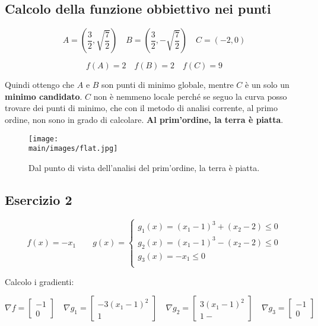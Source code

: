 \documentclass[\main/main.tex]{subfiles}
\begin{document}
\subsection{Calcolo della funzione obbiettivo nei punti}

\[
	A = (\dfrac{3}{2}, \sqrt{\dfrac{7}{2}}) \quad B = (\dfrac{3}{2}, -\sqrt{\dfrac{7}{2}})  \quad C = (-2, 0)
\]

\[
	f(A) = 2 \quad f(B) = 2 \quad f(C) = 9
\]

Quindi ottengo che $A$ e $B$ son punti di minimo globale, mentre $C$ è un solo un \textbf{minimo candidato}. $C$ non è nemmeno locale perché se seguo la curva posso trovare dei punti di minimo, che con il metodo di analisi corrente, al primo ordine, non sono in grado di calcolare. \textbf{Al prim'ordine, la terra è piatta}.

\begin{figure}[H]
	\center
	\texttt{[image: \\main/images/flat.jpg]}
	\caption{Dal punto di vista dell'analisi del prim'ordine, la terra è piatta.}
\end{figure}

\subsection{Esercizio 2}

\begin{center}
\end{center}


\[
	f(x) = -x_1 \qquad g(x) = \begin{cases}
		g_1(x) = (x_1-1)^3 + (x_2-2) \leq 0 \\
		g_2(x) = (x_1-1)^3 - (x_2-2) \leq 0 \\
		g_3(x) = -x_1\leq 0                 \\
	\end{cases}
\]

Calcolo i gradienti:

\[
	\nabla f = \begin{bmatrix}
		-1 \\
		0
	\end{bmatrix}
	\quad
	\nabla g_1 = \begin{bmatrix}
		-3(x_1-1)^2 \\
		1
	\end{bmatrix}
	\quad
	\nabla g_2 = \begin{bmatrix}
		3(x_1-1)^2 \\
		1-
	\end{bmatrix}
	\quad
	\nabla g_3 = \begin{bmatrix}
		-1 \\
		0
	\end{bmatrix}
\]
\end{document}

